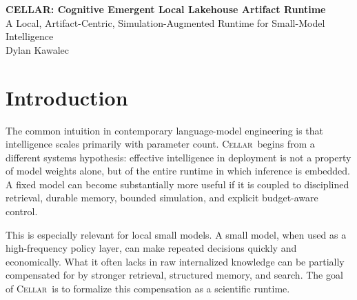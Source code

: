 \documentclass[11pt]{article}
\theoremstyle{definition}
\newcommand{\cellar}{\textsc{Cellar}}
\begin{document}
\begin{center}
    {\LARGE \textbf{CELLAR: Cognitive Emergent Local Lakehouse Artifact Runtime}}\\[0.5em]
    {\large A Local, Artifact-Centric, Simulation-Augmented Runtime for Small-Model Intelligence}\\[1em]
    {\large Dylan Kawalec}
\end{center}

\begin{abstract}
We introduce \cellar\ (\textbf{Cognitive Emergent Local Lakehouse Artifact Runtime}), a formal protocol for augmenting a small local language model with artifact memory, hierarchical simulation, budgeted metareasoning, and calibrated posterior aggregation. The central thesis is that a small model should not be treated as the whole of intelligence, but rather as a bounded policy layer governing retrieval, scheduling, selective simulation, and durable memory formation. The protocol is therefore designed around four commitments: inference primacy, artifact immutability, ephemeral execution state, and bounded hierarchical compute. Persistent memory is represented as a typed temporal multigraph over a two-plane storage substrate, while expensive computation is externalized into immutable artifacts with provenance. The terminal output of the system is not a claim of absolute truth, but a structured posterior decision summary with uncertainty, ranked explanatory paths, and replayable provenance. This paper presents the formal definitions, axioms, postulates, propositions, architectural layers, implementation notes, and algorithmic design principles of \cellar\ as a scientific runtime for local machine reasoning under bounded resources.
\end{abstract}

\section{Introduction}

The common intuition in contemporary language-model engineering is that intelligence scales primarily with parameter count. \cellar\ begins from a different systems hypothesis: effective intelligence in deployment is not a property of model weights alone, but of the entire runtime in which inference is embedded. A fixed model can become substantially more useful if it is coupled to disciplined retrieval, durable memory, bounded simulation, and explicit budget-aware control.

This is especially relevant for local small models. A small model, when used as a high-frequency policy layer, can make repeated decisions quickly and economically. What it often lacks in raw internalized knowledge can be partially compensated for by stronger retrieval, structured memory, and search. The goal of \cellar\ is to formalize this compensation as a scientific runtime.
\end{document}
